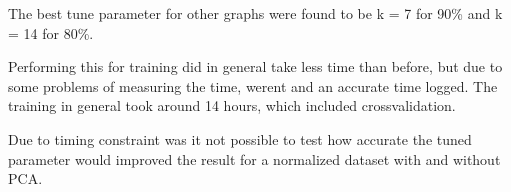 The best tune parameter for other graphs were found to be k = 7 for 90\% and k = 14 for 80\%.



Performing this for training did in general take less time than before, but due to some problems of measuring the time, werent and an accurate time logged.  The training in general took around 14 hours, which included crossvalidation.

Due to timing constraint was it not possible to test how accurate the tuned parameter would improved the result for a normalized dataset with and without PCA. 

